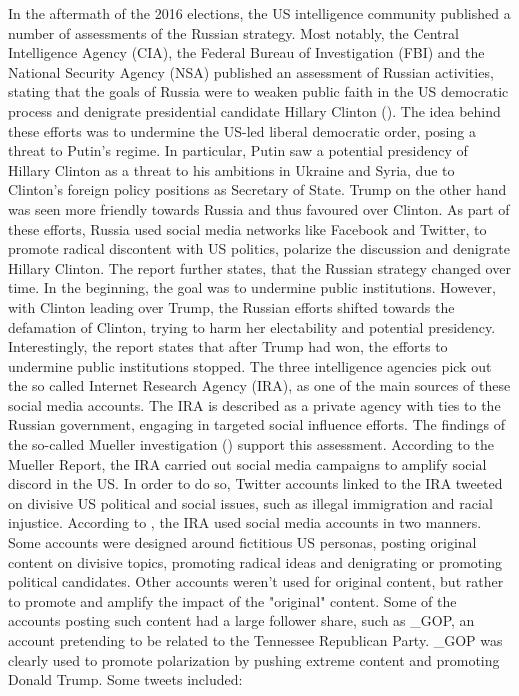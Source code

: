 \documentclass[12pt, authoryear]{elsarticle}
\begin{document}
In the aftermath of the 2016 elections, the US intelligence community published a number of assessments of the Russian strategy. Most notably, the Central Intelligence Agency (CIA), the Federal Bureau of Investigation (FBI) and the National Security Agency (NSA) published an assessment of Russian activities, stating that the goals of Russia were to weaken public faith in the US democratic process and denigrate presidential candidate Hillary Clinton (\cite{office2017assessing}). The idea behind these efforts was to undermine the US-led liberal democratic order, posing a threat to Putin's regime. In particular, Putin saw a potential presidency of Hillary Clinton as a threat to his ambitions in Ukraine and Syria, due to Clinton's foreign policy positions as Secretary of State. Trump on the other hand was seen more friendly towards Russia and thus favoured over Clinton. As part of these efforts, Russia used social media networks like Facebook and Twitter, to promote radical discontent with US politics, polarize the discussion and denigrate Hillary Clinton. The report further states, that the Russian strategy changed over time. In the beginning, the goal was to undermine public institutions. However, with Clinton leading over Trump, the Russian efforts shifted towards the defamation of Clinton, trying to harm her electability and potential presidency. Interestingly, the report states that after Trump had won, the efforts to undermine public institutions stopped. The three intelligence agencies pick out the so called Internet Research Agency (IRA), as one of the main sources of these social media accounts. The IRA is described as a private agency with ties to the Russian government, engaging in targeted social influence efforts.
The findings of the so-called Mueller investigation (\cite{mueller2019report}) support this assessment. According to the Mueller Report, the IRA carried out social media campaigns to amplify social discord in the US. In order to do so, Twitter accounts linked to the IRA tweeted on divisive US political and social issues, such as illegal immigration and racial injustice. According to \cite{mueller2019report}, the IRA used social media accounts in two manners. Some accounts were designed around fictitious US personas, posting original content on divisive topics, promoting radical ideas and denigrating or promoting political candidates. Other accounts weren't used for original content, but rather to promote and amplify the impact of the "original" content. Some of the  accounts posting such content had a large follower share, such as \@TEN\_GOP, an account pretending to be related to the Tennessee Republican Party. \@TEN\_GOP was clearly used to promote polarization by pushing extreme content and promoting Donald Trump. Some tweets included:
\end{document}
